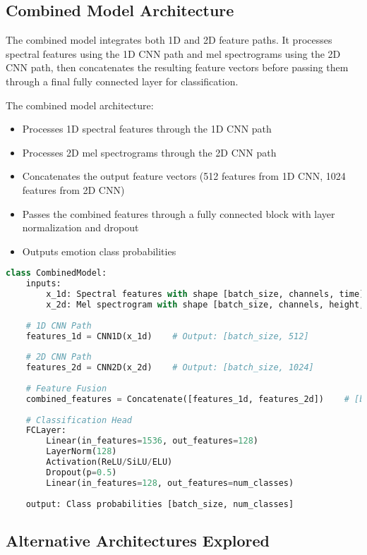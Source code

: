 \subsection{Combined Model Architecture}

The combined model integrates both 1D and 2D feature paths. It processes spectral features using the 1D CNN path and mel spectrograms using the 2D CNN path, then concatenates the resulting feature vectors before passing them through a final fully connected layer for classification.

The combined model architecture:
\begin{itemize}
    \item Processes 1D spectral features through the 1D CNN path
    \item Processes 2D mel spectrograms through the 2D CNN path
    \item Concatenates the output feature vectors (512 features from 1D CNN, 1024 features from 2D CNN)
    \item Passes the combined features through a fully connected block with layer normalization and dropout
    \item Outputs emotion class probabilities
\end{itemize}

\begin{lstlisting}[language=Python, style=pseudocode, caption=Combined Model Architecture (Pseudocode)]
class CombinedModel:
    inputs:
        x_1d: Spectral features with shape [batch_size, channels, time]
        x_2d: Mel spectrogram with shape [batch_size, channels, height, width]
    
    # 1D CNN Path
    features_1d = CNN1D(x_1d)    # Output: [batch_size, 512]
    
    # 2D CNN Path  
    features_2d = CNN2D(x_2d)    # Output: [batch_size, 1024]
    
    # Feature Fusion
    combined_features = Concatenate([features_1d, features_2d])    # [batch_size, 1536]
    
    # Classification Head
    FCLayer:
        Linear(in_features=1536, out_features=128)
        LayerNorm(128)
        Activation(ReLU/SiLU/ELU)
        Dropout(p=0.5)
        Linear(in_features=128, out_features=num_classes)
    
    output: Class probabilities [batch_size, num_classes]
\end{lstlisting}

\subsection{Alternative Architectures Explored}


